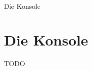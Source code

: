 
\begin{frame}{Die Konsole}
    \section{Die Konsole}\label{sec:die-konsole}

    TODO


\end{frame}